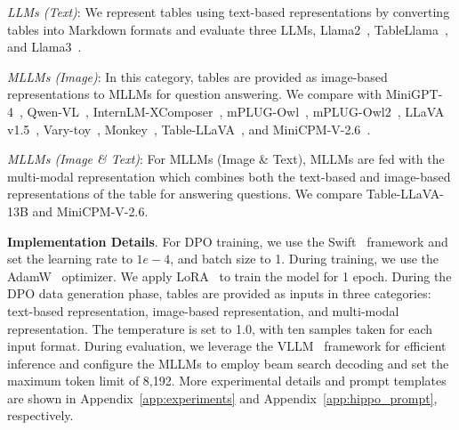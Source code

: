 \textit{LLMs (Text)}: We represent tables using text-based representations by converting tables into Markdown formats and evaluate three LLMs, Llama2~\cite{touvron2023llama}, TableLlama~\cite{zhang-etal-2024-tablellama}, and Llama3~\cite{dubey2024llama}.

\textit{MLLMs (Image)}: In this category, tables are provided as image-based representations to MLLMs for question answering. We compare \method{} with MiniGPT-4~\cite{zhu2024minigpt}, Qwen-VL~\cite{bai2023qwen}, InternLM-XComposer~\cite{zhang2023internlm}, mPLUG-Owl~\cite{ye2023mplug}, mPLUG-Owl2~\cite{ye2024mplug}, LLaVA v1.5~\cite{liu2024improved}, Vary-toy~\cite{wei2024small}, Monkey~\cite{li2024monkey}, Table-LLaVA~\cite{ZhengFSS0J024}, and MiniCPM-V-2.6~\cite{yao2024minicpm}.

\textit{MLLMs (Image \& Text)}: For MLLMs (Image \& Text), MLLMs are fed with the multi-modal representation which combines both the text-based and image-based representations of the table for answering questions. We compare \method{} Table-LLaVA-13B and MiniCPM-V-2.6.




\textbf{Implementation Details}. 
For DPO training, we use the Swift~\cite{zhao2024swift} framework and set the learning rate to $1e-4$, and batch size to 1. During training, we use the AdamW~\cite{kingma2014adam} optimizer. We apply LoRA~\cite{hu2022lora} to train the model for 1 epoch. During the DPO data generation phase, tables are provided as inputs in three categories: text-based representation, image-based representation, and multi-modal representation. The temperature is set to 1.0, with ten samples taken for each input format. During evaluation, we leverage the VLLM~\cite{kwon2023efficient} framework for efficient inference and configure the MLLMs to employ beam search decoding and set the maximum token limit of 8,192. More experimental details and prompt templates are shown in Appendix~\ref{app:experiments} and Appendix~\ref{app:hippo_prompt}, respectively.



